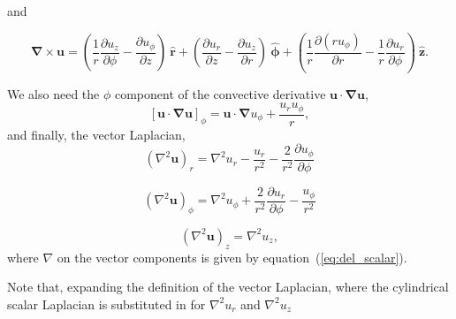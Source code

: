 \documentclass{paper}
\newcommand{\uphi}{\ensuremath{u_\phi}}
\newcommand{\rhat}{\ensuremath{\mathbf{\hat{r}}}}
\newcommand{\phihat}{\ensuremath{\mathbf{\hat{\phi}}}}
\newcommand{\zhat}{\ensuremath{\mathbf{\hat{z}}}}
\begin{document}
and 

\begin{equation}
  \label{eq:curl}
  \mathbf{\nabla \times u} = \left( \frac{1}{r} \frac{\partial u_z}{\partial \phi} - \frac{\partial u_\phi}{\partial z}\right)\ \rhat + \left(\frac{\partial u_r}{\partial z} - \frac{\partial u_z}{\partial r}\right)\ \phihat  + \left( \frac{1}{r} \frac{\partial (r \uphi)}{\partial r} - \frac{1}{r}\frac{\partial u_r}{\partial \phi}\right)\ \zhat.
\end{equation}

We also need the $\phi$ component of the convective derivative $\mathbf{u \cdot \nabla u}$,
\begin{equation}
  \label{eq:convective_deriv_phi}
  \left[\mathbf{u \cdot \nabla u} \right]_\phi = \mathbf{u \cdot \nabla} \uphi + \frac{ u_r \uphi}{r},
\end{equation}
and finally, the vector Laplacian,
\begin{equation}
  \label{eq:vec_lap_r}
  (\nabla^2 \mathbf{u})_r = \nabla^2 u_r - \frac{u_r}{r^2} - \frac{2}{r^2} \frac{\partial \uphi}{\partial \phi}
\end{equation}

\begin{equation}
  \label{eq:vec_lap_phi}
  (\nabla^2 \mathbf{u})_\phi = \nabla^2 u_\phi + \frac{2}{r^2} \frac{\partial u_r}{\partial \phi} - \frac{u_\phi}{r^2} 
\end{equation}

\begin{equation}
  \label{eq:vec_lap_z}
  (\nabla^2 \mathbf{u})_z = \nabla^2 u_z,
\end{equation}
where $\nabla$ on the vector components is given by equation~(\ref{eq:del_scalar}).

Note that, expanding the definition of the vector Laplacian, where the cylindrical scalar Laplacian is substituted in for $\nabla^2 u_r$ and $\nabla^2 u_z$  
\end{document}

